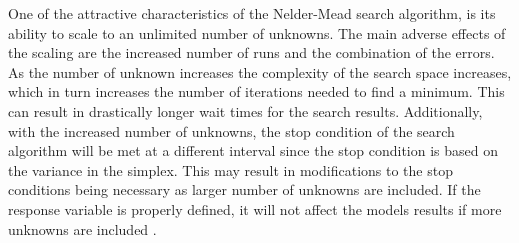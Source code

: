 \label{sensetivity_results}

One of the attractive characteristics of the Nelder-Mead search algorithm, is its ability to scale to an unlimited number of unknowns.  The main adverse effects of the scaling are the increased number of runs and the combination of the errors.  As the number of unknown increases the complexity of the search space increases, which in turn increases the number of iterations needed to find a minimum.  This can result in drastically longer wait times for the search results.  Additionally, with the increased number of unknowns, the stop condition of the search algorithm will be met at a different interval since the stop condition is based on the variance in the simplex.  This may result in modifications to the stop conditions being necessary as larger number of unknowns are included.  If the response variable is properly defined, it will not affect the models results if more unknowns are included \cite{wang_2011}.

